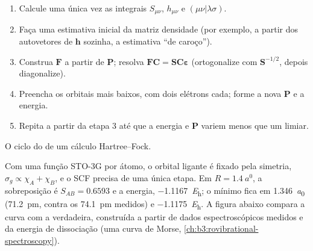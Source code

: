 \begin{method}\label{met:b3:computational-chemistry:scf}
\begin{enumerate}
  \item Calcule uma única vez as integrais $S_{\mu\nu}$, $h_{\mu\nu}$ e $(\mu\nu|\lambda\sigma)$.
  \item Faça uma estimativa inicial da matriz densidade (por exemplo, a partir dos
        autovetores de $\mathbf h$ sozinha, a estimativa ``de caroço'').
  \item Construa $\mathbf F$ a partir de $\mathbf P$; resolva $\mathbf F\mathbf C = \mathbf S\mathbf C
        \boldsymbol\varepsilon$ (ortogonalize com $\mathbf S^{-1/2}$, depois diagonalize).
  \item Preencha os orbitais mais baixos, com dois elétrons cada; forme a nova $\mathbf P$
        e a energia.
  \item Repita a partir da etapa 3 até que a energia e $\mathbf P$ variem menos
        que um limiar.
\end{enumerate}
\end{method}

\begin{omfigure}

{\small O ciclo do  de um cálculo Hartree--Fock.}
\end{omfigure}

\begin{example}\label{ex:b3:computational-chemistry:h2}
Com uma função STO-3G por átomo, o orbital ligante é fixado pela simetria,
$\sigma_g \propto \chi_A + \chi_B$, e o SCF precisa de uma única etapa. Em $R =
\qty{1.4}{\bohr}$, a sobreposição é $S_{AB} = 0.6593$ e a energia,
\qty{-1.1167}{\hartree}; o mínimo fica em \qty{1.346}{\bohr} (\qty{71.2}{pm},
contra os \qty{74.1}{pm} medidos) e \qty{-1.1175}{\hartree}. A figura abaixo
compara a curva com a verdadeira, construída a partir de dados espectroscópicos
medidos e da energia de dissociação (uma curva de Morse, \cref{ch:b3:rovibrational-spectroscopy}).
\end{example}


